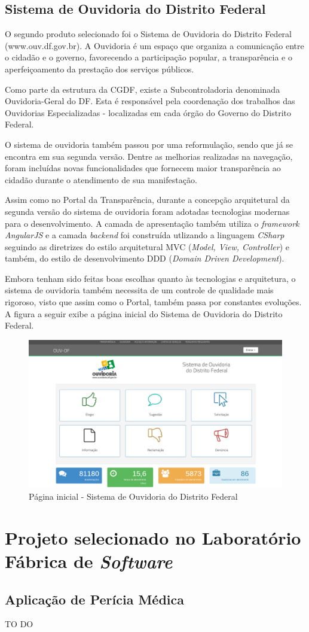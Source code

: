 \subsection{Sistema de Ouvidoria do Distrito Federal}

O segundo produto selecionado foi o Sistema de Ouvidoria do Distrito Federal (www.ouv.df.gov.br). A Ouvidoria é um espaço que organiza a comunicação entre o cidadão e o governo, favorecendo a participação popular, a transparência e o aperfeiçoamento da prestação dos serviços públicos.

Como parte da estrutura da CGDF, existe a Subcontroladoria denominada Ouvidoria-Geral do DF. Esta é responsável pela coordenação dos trabalhos das Ouvidorias Especializadas - localizadas em cada órgão do Governo do Distrito Federal.

O sistema de ouvidoria também passou por uma reformulação, sendo que já se encontra em sua segunda versão. Dentre as melhorias realizadas na navegação, foram incluídas novas funcionalidades que fornecem maior transparência ao cidadão durante o atendimento de sua manifestação.

Assim como no Portal da Transparência, durante a concepção arquitetural da segunda versão do sistema de ouvidoria foram adotadas tecnologias modernas para o desenvolvimento. A camada de apresentação também utiliza o \textit{framework AngularJS} e a camada \textit{backend} foi construída utlizando a linguagem \textit{CSharp} seguindo as diretrizes do estilo arquitetural MVC (\textit{Model, View, Controller}) e também, do estilo de desenvolvimento DDD (\textit{Domain Driven Development}).

Embora tenham sido feitas boas escolhas quanto às tecnologias e arquitetura, o sistema de ouvidoria também necessita de um controle de qualidade mais rigoroso, visto que assim como o Portal, também passa por constantes evoluções. A figura a seguir exibe a página inicial do Sistema de Ouvidoria do Distrito Federal.

\begin{figure}[h]
\includegraphics[width=\textwidth]{figuras/sistemaOuvidoria.png}
\caption{Página inicial - Sistema de Ouvidoria do Distrito Federal}
\end{figure}

\section{Projeto selecionado no Laboratório Fábrica de \textit{Software}}

\subsection{Aplicação de Perícia Médica}

TO DO